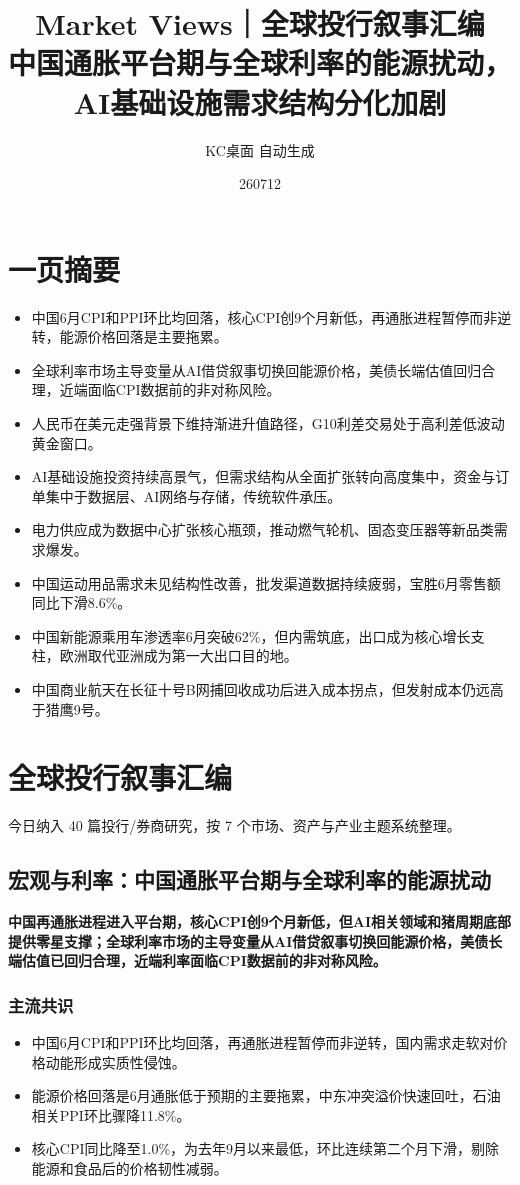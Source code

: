 \documentclass[11pt]{ctexart}
\title{\textbf{Market Views｜全球投行叙事汇编}\\[0.4em]{\large 中国通胀平台期与全球利率的能源扰动，AI基础设施需求结构分化加剧}}
\author{KC桌面 自动生成}
\date{260712}
\begin{document}
\maketitle
\tableofcontents
\newpage
\section{一页摘要}
\begin{itemize}
  \item 中国6月CPI和PPI环比均回落，核心CPI创9个月新低，再通胀进程暂停而非逆转，能源价格回落是主要拖累。
  \item 全球利率市场主导变量从AI借贷叙事切换回能源价格，美债长端估值回归合理，近端面临CPI数据前的非对称风险。
  \item 人民币在美元走强背景下维持渐进升值路径，G10利差交易处于高利差低波动黄金窗口。
  \item AI基础设施投资持续高景气，但需求结构从全面扩张转向高度集中，资金与订单集中于数据层、AI网络与存储，传统软件承压。
  \item 电力供应成为数据中心扩张核心瓶颈，推动燃气轮机、固态变压器等新品类需求爆发。
  \item 中国运动用品需求未见结构性改善，批发渠道数据持续疲弱，宝胜6月零售额同比下滑8.6\%。
  \item 中国新能源乘用车渗透率6月突破62\%，但内需筑底，出口成为核心增长支柱，欧洲取代亚洲成为第一大出口目的地。
  \item 中国商业航天在长征十号B网捕回收成功后进入成本拐点，但发射成本仍远高于猎鹰9号。
\end{itemize}
\section{全球投行叙事汇编}
今日纳入 40 篇投行/券商研究，按 7 个市场、资产与产业主题系统整理。
\newpage
\subsection{宏观与利率：中国通胀平台期与全球利率的能源扰动}
\textbf{中国再通胀进程进入平台期，核心CPI创9个月新低，但AI相关领域和猪周期底部提供零星支撑；全球利率市场的主导变量从AI借贷叙事切换回能源价格，美债长端估值已回归合理，近端利率面临CPI数据前的非对称风险。}
\subsubsection*{主流共识}
\begin{itemize}
  \item 中国6月CPI和PPI环比均回落，再通胀进程暂停而非逆转，国内需求走软对价格动能形成实质性侵蚀。
  \item 能源价格回落是6月通胀低于预期的主要拖累，中东冲突溢价快速回吐，石油相关PPI环比骤降11.8\%。
  \item 核心CPI同比降至1.0\%，为去年9月以来最低，环比连续第二个月下滑，剔除能源和食品后的价格韧性减弱。
\end{itemize}
\end{document}
